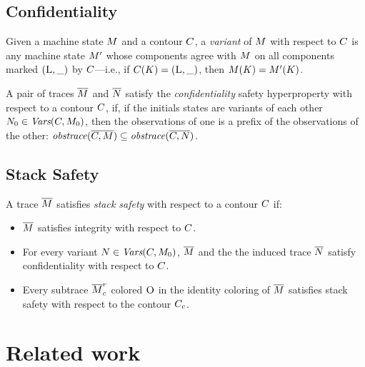 \documentclass[conference]{IEEEtran}
\begin{document}
\subsection{Confidentiality}

Given a machine state $M$ and a contour $C$, a {\em
  variant} of $M$ with respect to $C$ is any machine state
$M'$ whose components agree with $M$ on all components marked
$(\textsc{L}, \_)$ by $C$---i.e., if $C(K) =
(\textsc{L}, \_)$, then $M(K) = M'(K)$.

A pair of traces $\overline{M}$ and $\overline{N}$ satisfy the {\em
  confidentiality} safety hyperproperty with respect to a contour
$C$, if, if the initials states are variants of each other $N_0
\in \textit{Vars}(C, M_0)$, then the observations of one is a prefix of the
observations of the other: $\mathit{obstrace}(\overline{C, M}) \subseteq
\mathit{obstrace}(\overline{C, N})$.


\subsection{Stack Safety}

A trace $\overline{M}$ satisfies {\em stack safety} with respect to a
contour $C$ if:
\begin{itemize}
\item $\overline{M}$ satisfies integrity with respect to $C$.
\item For every variant $N \in \textit{Vars}(C, M_0)$, $\overline{M}$
  and the the induced trace $\overline{N}$ satisfy confidentiality with
  respect to $C$.
\item Every subtrace $\overline{M}^r_c$ colored $\textsc{O}$ in the
  identity coloring of $\overline{M}$ satisfies stack safety with
  respect to the contour $C_c$.
\end{itemize}



\section{Related work}

\end{document}
